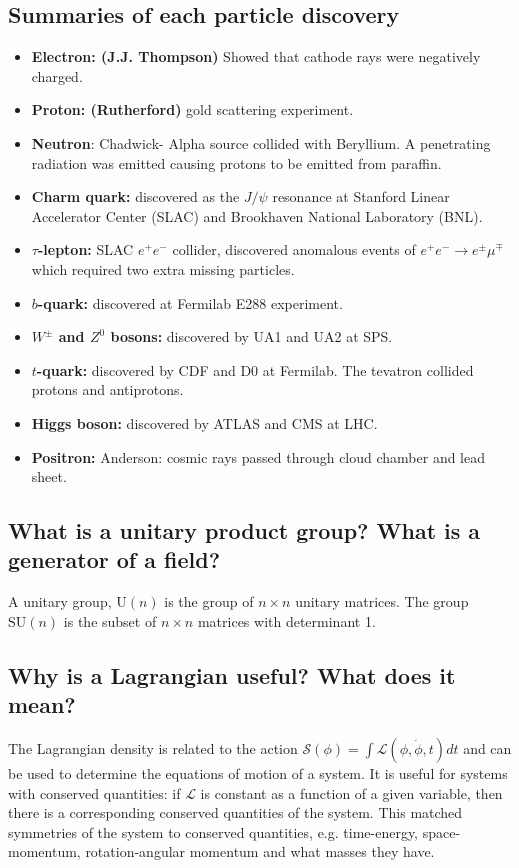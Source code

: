 \documentclass[12pt]{article}
\begin{document}
\subsection{Summaries of each particle discovery}
\begin{itemize}
\item \textbf{Electron: (J.J. Thompson)} Showed that cathode rays were negatively charged.
\item \textbf{Proton: (Rutherford)} gold scattering experiment.
\item \textbf{Neutron}: Chadwick- Alpha source collided with Beryllium. A penetrating radiation was emitted causing protons to be emitted from paraffin.  
\item \textbf{Charm quark:} discovered as the $J/\psi$ resonance at Stanford Linear Accelerator Center (SLAC) and Brookhaven National Laboratory (BNL). 
\item \textbf{$\tau$-lepton:}  SLAC $e^+e^-$ collider, discovered anomalous events of $e^+e^-\rightarrow e^\pm\mu^\mp$ which required two extra missing particles.
\item \textbf{$b$-quark:} discovered at Fermilab E288 experiment. 
\item \textbf{$W^{\pm}$ and $Z^{0}$ bosons:} discovered by UA1 and UA2 at SPS. 
\item \textbf{$t$-quark:} discovered by CDF and D0 at Fermilab. The tevatron collided protons and antiprotons. 
\item \textbf{Higgs boson:} discovered by ATLAS and CMS at LHC.
\item \textbf{Positron:} Anderson: cosmic rays passed through cloud chamber and lead sheet.
\end{itemize}

\subsection{What is a unitary product group? What is a generator of a field?}
A unitary group, $\text{U}(n)$ is the group of $n\times n$ unitary matrices.
The group $\text{SU}(n)$ is the subset of $n\times n$ matrices with determinant 1. 

\subsection{Why is a Lagrangian useful? What does it mean?}
The Lagrangian density is related to the action $\mathcal{S}(\phi) =\int \mathcal{L}(\phi,\dot{\phi},t) dt$ and can be used to determine the equations of motion of a system.
It is useful for systems with conserved quantities: if $\mathcal{L}$ is constant as a function of a given variable, then there is a corresponding conserved quantities of the system. This matched symmetries of the system to conserved quantities, e.g. time-energy, space-momentum, rotation-angular momentum and what masses they have.
\end{document}
